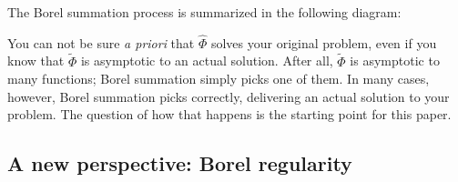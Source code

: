 \documentclass{article}
\newcommand{\series}[1]{\tilde{#1}}
\newcommand{\laplace}{\mathcal{L}}
\newcommand{\borel}{\mathcal{B}}
\newcommand{\aexp}{\mathrm{\ae}}
\theoremstyle{definition}
\theoremstyle{plain}
\begin{document}
The Borel summation process is summarized in the following diagram:
\begin{center}
\end{center}

You can not be sure {\em a priori} that $\hat{\Phi}$ solves your original problem, even if you know that $\series{\Phi}$ is asymptotic to an actual solution. After all, $\series{\Phi}$ is asymptotic to many functions; Borel summation simply picks one of them. In many cases, however, Borel summation picks correctly, delivering an actual solution to your problem. The question of how that happens is the starting point for this paper.
%
\subsection{A new perspective: Borel regularity}
%
\end{document}
